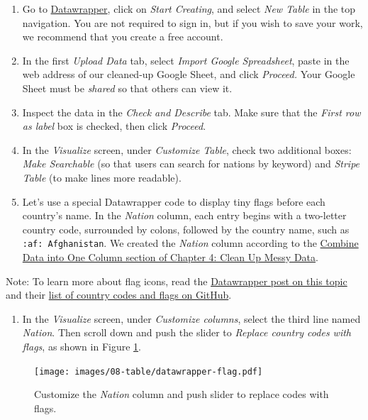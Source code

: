 \documentclass[
  english,
]{book}
\providecommand{\tightlist}{%
  \setlength{\itemsep}{0pt}\setlength{\parskip}{0pt}}
\begin{document}
\begin{enumerate}
\def\labelenumi{\arabic{enumi}.}
\setcounter{enumi}{1}
\item
  Go to \href{https://www.datawrapper.de}{Datawrapper}, click on \emph{Start Creating}, and select \emph{New Table} in the top navigation. You are not required to sign in, but if you wish to save your work, we recommend that you create a free account.
\item
  In the first \emph{Upload Data} tab, select \emph{Import Google Spreadsheet}, paste in the web address of our cleaned-up Google Sheet, and click \emph{Proceed.} Your Google Sheet must be \emph{shared} so that others can view it.
\item
  Inspect the data in the \emph{Check and Describe} tab. Make sure that the \emph{First row as label} box is checked, then click \emph{Proceed}.
\item
  In the \emph{Visualize} screen, under \emph{Customize Table}, check two additional boxes: \emph{Make Searchable} (so that users can search for nations by keyword) and \emph{Stripe Table} (to make lines more readable).
\item
  Let's use a special Datawrapper code to display tiny flags before each country's name. In the \emph{Nation} column, each entry begins with a two-letter country code, surrounded by colons, followed by the country name, such as \texttt{:af:\ Afghanistan}. We created the \emph{Nation} column according to the \href{combine-data.html}{Combine Data into One Column section of Chapter 4: Clean Up Messy Data}.
\end{enumerate}

Note: To learn more about flag icons, read the \href{https://academy.datawrapper.de/article/144-how-to-insert-flag-icons-in-tables}{Datawrapper post on this topic} and their \href{https://github.com/datawrapper/datawrapper/wiki/Country-flag-icons}{list of country codes and flags on GitHub}.

\begin{enumerate}
\def\labelenumi{\arabic{enumi}.}
\setcounter{enumi}{6}
\tightlist
\item
  In the \emph{Visualize} screen, under \emph{Customize columns}, select the third line named \emph{Nation}. Then scroll down and push the slider to \emph{Replace country codes with flags}, as shown in Figure \ref{fig:datawrapper-flag}.
\end{enumerate}



\begin{figure}
\centering
\texttt{[image: images/08-table/datawrapper-flag.pdf]}
\caption{\label{fig:datawrapper-flag}Customize the \emph{Nation} column and push slider to replace codes with flags.}
\end{figure}
\end{document}
